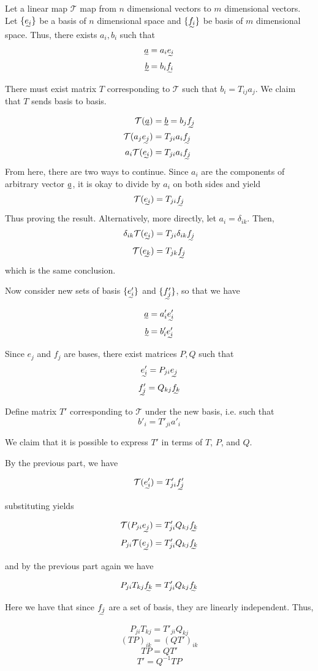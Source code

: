\documentclass[12pt]{article}
\begin{document}
Let a linear map $\mathcal{T}$ map from $n$ dimensional vectors to $m$ dimensional vectors.
Let $\{\undertilde{e_i}\}$ be a basis of $n$ dimensional space and 
$\{\undertilde{f_i}\}$ be basis of $m$ dimensional space.
Thus, there exists $a_i,b_i$ such that

\[\undertilde{a} = a_{i} \undertilde{e_{i}}\]
\[\undertilde{b} = b_{i} \undertilde{f_{i}}\]

There must exist matrix $T$ corresponding to $\mathcal{T}$ such that $b_i = T_{ij}a_j$.
We claim that $T$ sends basis to basis.

\[ \begin{aligned}
        \mathcal{T}(\undertilde{a}) &= \undertilde{b} = b_j \undertilde{f_j}\\
        \mathcal{T}(a_j\undertilde{e_j}) &= T_{ji}a_i\undertilde{f_j}\\
        a_i\mathcal{T}(\undertilde{e_i}) &= T_{ji}a_i\undertilde{f_j}\\
\end{aligned} \]
From here, there are two ways to continue. 
Since $a_i$ are the components of arbitrary vector $\undertilde{a}$,
it is okay to divide by $a_i$ on both sides and yield
\[\mathcal{T}(\undertilde{e_i}) = T_{ji}\undertilde{f_j}\]
Thus proving the result. Alternatively, more directly,
let $a_i = \delta_{ik}$. Then,
\[\delta_{ik}\mathcal{T}(\undertilde{e_i}) = T_{ji}\delta_{ik}\undertilde{f_j}\]
\[\mathcal{T}(\undertilde{e_k}) = T_{jk}\undertilde{f_j}\]
which is the same conclusion.

Now consider new sets of basis $\{\undertilde{e'_{i}}\}$ and $\{\undertilde{f'_{j}}\}$, so that we have

\[\undertilde{a} = a'_{i}\undertilde{e'_{i}}\]
\[\undertilde{b} = b'_{i}\undertilde{e'_{i}}\]

Since $e_j$ and $f_j$ are bases, there exist matrices $P,Q$ such that
\[\undertilde{e'_{i}} = P_{ji}\undertilde{e_{j}}\]
\[\undertilde{f'_{j}} = Q_{kj}\undertilde{f_{k}}\]

Define matrix $T'$ corresponding to $\mathcal{T}$ under the new basis, i.e. such that
\[b'_{i} = T'_{ji}a'_{i}\]

We claim that it is possible to express $T'$ in terms of $T$, $P$, and $Q$.

By the previous part, we have

\[\mathcal{T}(\undertilde{e'_{i}}) = T'_{ji}\undertilde{f'_{j}}\]

substituting yields

\[\mathcal{T}(P_{ji}\undertilde{e_{j}}) = T'_{ji}Q_{kj}\undertilde{f_{k}}\]
\[P_{ji}\mathcal{T}(\undertilde{e_{j}}) = T'_{ji}Q_{kj}\undertilde{f_{k}}\]

and by the previous part again we have

\[P_{ji}T_{kj}\undertilde{f_k} = T'_{ji}Q_{kj}\undertilde{f_{k}}\]

Here we have that since $\undertilde{f_j}$ are a set of basis, they are linearly independent. Thus,

\[P_{ji}T_{kj} = T'_{ji}Q_{kj}\]
\[(TP)_{ik} = (QT')_{ik}\]
\[TP = QT'\]
\[T' = Q^{-1}TP\]
\end{document}
